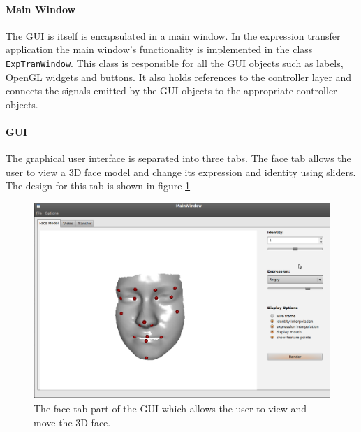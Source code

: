 \documentclass[11pt,a4paper]{report}
\begin{document}
\paragraph{Main Window}
The GUI is itself is encapsulated in a main window. In the expression transfer application the
main window's functionality is implemented in the class
\texttt{ExpTranWindow}. This class is responsible for all the GUI objects such
as labels, OpenGL widgets and buttons. It also holds references to the controller
layer and connects the signals emitted by the GUI objects to the appropriate
controller objects.
\paragraph{GUI}
The graphical user interface is separated into three tabs. The face tab allows
the user to view a 3D face model and change its expression and identity using
sliders. The design for this tab is shown in figure \ref{fg:facetab}

\begin{figure}[h]
\begin{centering}
\includegraphics[scale=0.35]{images/facetab.png}
\par\end{centering}

\caption{The face tab part of the GUI which allows the user to view and move the
  3D face.}
\label{fg:facetab}
\end{figure}
\end{document}
